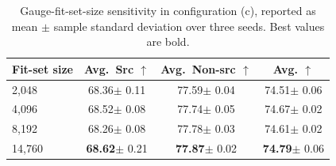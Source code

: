 \begin{table}[H]
    \centering
    \caption{Gauge-fit-set-size sensitivity in configuration (c), reported as
    mean $\pm$ sample standard deviation over three seeds. Best values are
    bold.}
    \label{tab:gauge-fit-sensitivity}
    \small
    \newcommand{\gfsencell}[2]{#1{\tiny $\pm$ #2}}
    \setlength{\tabcolsep}{9pt}
    \begin{tabular}{@{}lccc@{}}
        \toprule
        Fit-set size & Avg.~Src $\uparrow$ & Avg.~Non-src $\uparrow$ & Avg. $\uparrow$ \\
        \midrule
        2{,}048  & \gfsencell{68.36}{0.11} & \gfsencell{77.59}{0.04} & \gfsencell{74.51}{0.06} \\
        4{,}096  & \gfsencell{68.52}{0.08} & \gfsencell{77.74}{0.05} & \gfsencell{74.67}{0.02} \\
        8{,}192  & \gfsencell{68.26}{0.08} & \gfsencell{77.78}{0.03} & \gfsencell{74.61}{0.02} \\
        14{,}760 & \gfsencell{\textbf{68.62}}{0.21} & \gfsencell{\textbf{77.87}}{0.02} & \gfsencell{\textbf{74.79}}{0.06} \\
        \bottomrule
    \end{tabular}
\end{table}
